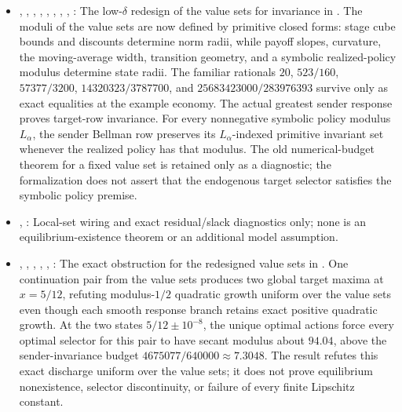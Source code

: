 \begin{itemize}[leftmargin=1.4em,itemsep=1pt]
\item {}, , , , , , , , : The low-\(\delta\) redesign of the value sets for invariance in . The moduli of the value sets are now defined by primitive closed forms: stage cube bounds and discounts determine norm radii, while payoff slopes, curvature, the moving-average width, transition geometry, and a symbolic realized-policy modulus determine state radii. The familiar rationals \(20\), \(523/160\), \(57377/3200\), \(14320323/3787700\), and \(25683423000/283976393\) survive only as exact equalities at the example economy. The actual greatest sender response proves target-row invariance. For every nonnegative symbolic policy modulus \(L_\alpha\), the sender Bellman row preserves its \(L_\alpha\)-indexed primitive invariant set whenever the realized policy has that modulus. The old numerical-budget theorem for a fixed value set is retained only as a diagnostic; the formalization does not assert that the endogenous target selector satisfies the symbolic policy premise.
\item {}, : Local-set wiring and exact residual/slack diagnostics only; none is an equilibrium-existence theorem or an additional model assumption.
\item {}, , , , , : The exact obstruction for the redesigned value sets in . One continuation pair from the value sets produces two global target maxima at \(x=5/12\), refuting modulus-\(1/2\) quadratic growth uniform over the value sets even though each smooth response branch retains exact positive quadratic growth. At the two states \(5/12\pm10^{-8}\), the unique optimal actions force every optimal selector for this pair to have secant modulus about \(94.04\), above the sender-invariance budget \(4675077/640000\approx7.3048\). The result refutes this exact discharge uniform over the value sets; it does not prove equilibrium nonexistence, selector discontinuity, or failure of every finite Lipschitz constant.

\end{itemize}

